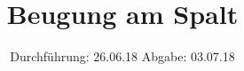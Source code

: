 
\setlength{\parindent}{0em}

\subject{V408}
\title{Beugung am Spalt}
\date{%
  Durchführung: 26.06.18
  \hspace{3em}
  Abgabe: 03.07.18
}



\maketitle
\thispagestyle{empty}
\tableofcontents
\newpage
\setlength{\parindent}{0em}




\printbibliography{}


